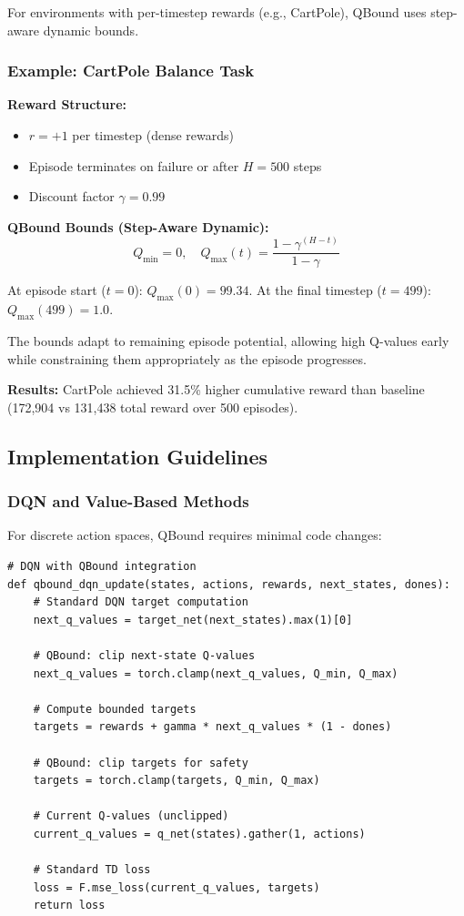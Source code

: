\documentclass[11pt]{article}
\theoremstyle{definition}
\theoremstyle{remark}
\begin{document}
For environments with per-timestep rewards (e.g., CartPole), QBound uses step-aware dynamic bounds.

\subsubsection{Example: CartPole Balance Task}

\textbf{Reward Structure:}
\begin{itemize}
    \item $r = +1$ per timestep (dense rewards)
    \item Episode terminates on failure or after $H = 500$ steps
    \item Discount factor $\gamma = 0.99$
\end{itemize}

\textbf{QBound Bounds (Step-Aware Dynamic):}
$$Q_{\min} = 0, \quad Q_{\max}(t) = \frac{1-\gamma^{(H-t)}}{1-\gamma}$$

At episode start ($t=0$): $Q_{\max}(0) = 99.34$. At the final timestep ($t=499$): $Q_{\max}(499) = 1.0$.

The bounds adapt to remaining episode potential, allowing high Q-values early while constraining them appropriately as the episode progresses.

\textbf{Results:} CartPole achieved 31.5\% higher cumulative reward than baseline (172,904 vs 131,438 total reward over 500 episodes).

\subsection{Implementation Guidelines}

\subsubsection{DQN and Value-Based Methods}

For discrete action spaces, QBound requires minimal code changes:

\begin{lstlisting}
# DQN with QBound integration
def qbound_dqn_update(states, actions, rewards, next_states, dones):
    # Standard DQN target computation
    next_q_values = target_net(next_states).max(1)[0]

    # QBound: clip next-state Q-values
    next_q_values = torch.clamp(next_q_values, Q_min, Q_max)

    # Compute bounded targets
    targets = rewards + gamma * next_q_values * (1 - dones)

    # QBound: clip targets for safety
    targets = torch.clamp(targets, Q_min, Q_max)

    # Current Q-values (unclipped)
    current_q_values = q_net(states).gather(1, actions)

    # Standard TD loss
    loss = F.mse_loss(current_q_values, targets)
    return loss
\end{lstlisting}
\end{document}
